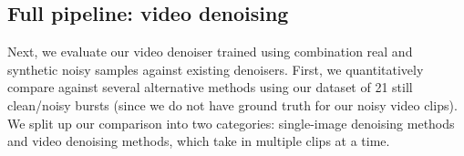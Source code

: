 \documentclass[final]{cvpr}
\begin{document}
\begin{comment}
\begin{table}[thb]
    \centering
    \newcolumntype{Z}{S[table-format=1.3,table-auto-round]}
	\begin{tabularx}{\linewidth}{*{7}{p{8.5mm}@{\hspace{2mm}}}Z@{}}
    \toprule
    \footnotesize read & \footnotesize shot & \footnotesize quant. & \footnotesize row & \footnotesize row t. & \footnotesize periodic & \footnotesize fixed & \footnotesize {KLD} \\
    \midrule
    $\bullet$ & & & & & &                                        & 0.4000 \\
    $\bullet$ & $\bullet$ & & & & &                                  & 0.4001 \\
    $\bullet$ & $\bullet$ & $\bullet$ & & & &                            & 0.4048 \\
    $\bullet$ & $\bullet$ & $\bullet$ & $\bullet$ & $\bullet$ & &                & 0.1184 \\
    $\bullet$ & $\bullet$ & $\bullet$ & $\bullet$ & $\bullet$ & $\bullet$ &          & 0.1133 \\
    $\bullet$ & $\bullet$ & $\bullet$ & $\bullet$ & $\bullet$ & $\bullet$ & $\bullet$    & 0.1375 \\
    $\bullet$ & $\bullet$ & $\bullet$ & $\bullet$ & $\bullet$ & $\bullet$ & $\star$   & 0.0842 \\
    \midrule
    \multicolumn{7}{l}{Full model}                                 & \bfseries 0.0691 \\
    \bottomrule
    \end{tabularx}
    \caption{Ablation of noise components modeled by our noise generator.\stephan{What is the difference between last two rows before full model?}}
    \label{tab:noise_ablation}
\end{table}
\end{comment}











\subsection{Full pipeline: video denoising}
Next, we evaluate our video denoiser trained using combination real and synthetic noisy samples against existing denoisers. First, we quantitatively compare against several alternative methods using our dataset of 21 still clean/noisy bursts (since we do not have ground truth for our noisy video clips). We split up our comparison into two categories: single-image denoising methods and video denoising methods, which take in multiple clips at a time.
\end{document}
